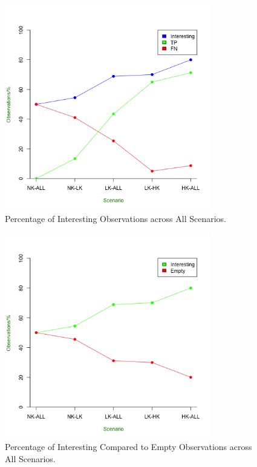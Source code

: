 	\begin{figure}[h]
	\centering
	\includegraphics[width=0.8\textwidth]{Chap7/figures/saturated/int_percent}
	\caption{Percentage of Interesting Observations across All Scenarios.}
	\label{fig:sat:int:percent}
	\end{figure}

	\begin{figure}[h]
	\centering
	\includegraphics[width=0.8\textwidth]{Chap7/figures/saturated/int_vs_empty}
	\caption{Percentage of Interesting Compared to Empty Observations across All Scenarios.}
	\label{fig:sat:int:empty}
	\end{figure}

